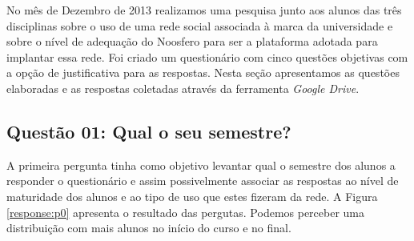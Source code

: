 No mês de Dezembro de 2013 realizamos uma pesquisa junto aos alunos das três
disciplinas sobre o uso de uma rede social associada à marca da universidade
e sobre o nível de adequação do Noosfero para ser a plataforma adotada para
implantar essa rede.
%
Foi criado um questionário com cinco questões objetivas com a opção de
justificativa para as respostas.
%
Nesta seção apresentamos as questões elaboradas e as respostas coletadas
através da ferramenta \textit{Google Drive}.

\subsection*{Questão 01: Qual o seu semestre?}

A primeira pergunta tinha como objetivo levantar qual o semestre dos alunos
a responder o questionário e assim possivelmente associar as respostas
ao nível de maturidade dos alunos e ao tipo de uso que estes fizeram da rede.
%
A Figura \ref{response:p0} apresenta o resultado das pergutas. Podemos perceber
uma distribuição com mais alunos no início do curso e no final.
